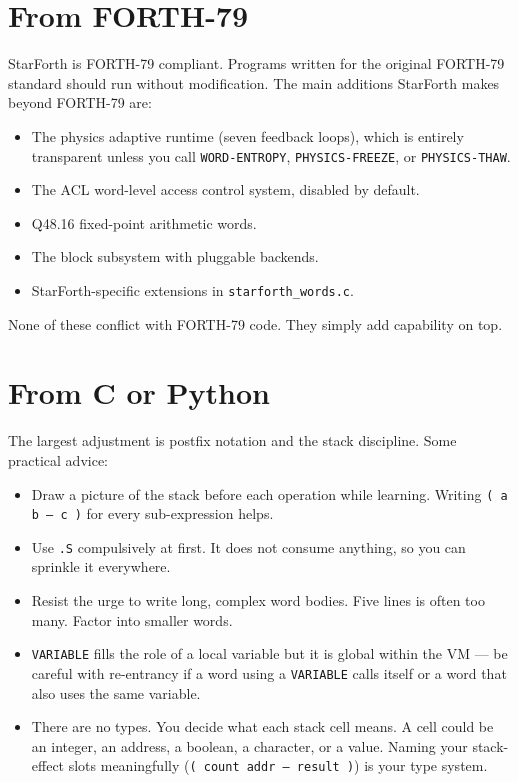 \section{From FORTH-79}
\label{sec:migrate-forth79}

StarForth is FORTH-79 compliant. Programs written for the original FORTH-79
standard should run without modification. The main additions StarForth makes
beyond FORTH-79 are:

\begin{itemize}
  \item The physics adaptive runtime (seven feedback loops), which is entirely
    transparent unless you call \texttt{WORD-ENTROPY},
    \texttt{PHYSICS-FREEZE}, or \texttt{PHYSICS-THAW}.
  \item The ACL word-level access control system, disabled by default.
  \item Q48.16 fixed-point arithmetic words.
  \item The block subsystem with pluggable backends.
  \item StarForth-specific extensions in \texttt{starforth\_words.c}.
\end{itemize}

None of these conflict with FORTH-79 code. They simply add capability on top.

\section{From C or Python}
\label{sec:migrate-c-python}

The largest adjustment is postfix notation and the stack discipline. Some
practical advice:

\begin{itemize}
  \item Draw a picture of the stack before each operation while learning.
    Writing \texttt{( a b -- c )} for every sub-expression helps.

  \item Use \texttt{.S} compulsively at first. It does not consume anything,
    so you can sprinkle it everywhere.

  \item Resist the urge to write long, complex word bodies. Five lines is
    often too many. Factor into smaller words.

  \item \texttt{VARIABLE} fills the role of a local variable but it is global
    within the VM --- be careful with re-entrancy if a word using a
    \texttt{VARIABLE} calls itself or a word that also uses the same variable.

  \item There are no types. You decide what each stack cell means. A cell could
    be an integer, an address, a boolean, a character, or a \Qtype{} value.
    Naming your stack-effect slots meaningfully (\texttt{( count addr -- result )})
    is your type system.
\end{itemize}
